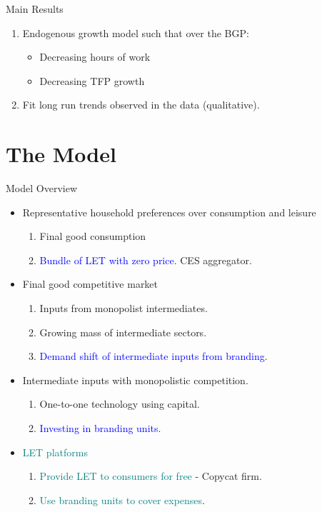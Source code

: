 \documentclass[usenames,dvipsnames]{beamer}
\begin{document}
\begin{frame}{Main Results}
\begin{enumerate}
    \item Endogenous growth model such that over the BGP:
    \begin{itemize}
        \item Decreasing hours of work
        \item Decreasing TFP growth 
    \end{itemize}
    \item Fit long run trends observed in the data (qualitative).  
\end{enumerate}
    
\end{frame}

\section{The Model}

\begin{frame}{Model Overview}
\begin{itemize}
    \item Representative household preferences over consumption and leisure
    \begin{enumerate}
        \item Final good consumption
        \item \textcolor{blue}{Bundle of LET with zero price}. CES aggregator. 
    \end{enumerate}
    \item Final good competitive market
    \begin{enumerate}
        \item Inputs from monopolist intermediates. 
        \item Growing mass of intermediate sectors. 
        \item \textcolor{blue}{Demand shift of intermediate inputs from branding}. 
    \end{enumerate}
    \item Intermediate inputs with monopolistic competition. 
    \begin{enumerate}
        \item One-to-one technology using capital. 
        \item \textcolor{blue}{Investing in branding units}.
    \end{enumerate}
    \pause 
    \item \textcolor{teal}{LET platforms}
    \begin{enumerate}
        \item \textcolor{teal}{Provide LET to consumers for free} - Copycat firm. 
        \item \textcolor{teal}{Use branding units to cover expenses}.
    \end{enumerate}
\end{itemize}
    
\end{frame}
\end{document}
